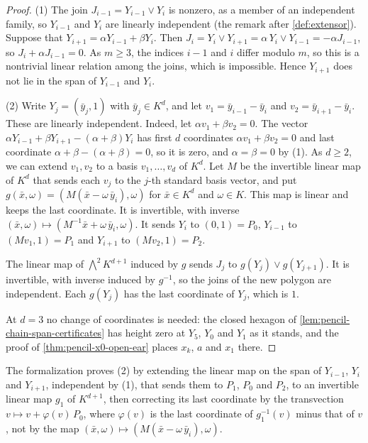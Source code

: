 \begin{proof}
  \leanok
  (1) The join $J_{i-1} = Y_{i-1} \vee Y_i$ is nonzero, as a member of
  an independent family, so $Y_{i-1}$ and $Y_i$ are linearly independent
  (the remark after \cref{def:extensor}). Suppose that
  $Y_{i+1} = \alpha Y_{i-1} + \beta Y_i$. Then
  $J_i = Y_i \vee Y_{i+1} = \alpha\, Y_i \vee Y_{i-1} = -\alpha J_{i-1}$,
  so $J_i + \alpha J_{i-1} = 0$. As $m \ge 3$, the indices $i - 1$ and $i$
  differ modulo $m$, so this is a nontrivial linear relation among the
  joins, which is impossible. Hence $Y_{i+1}$ does not lie in the span of
  $Y_{i-1}$ and $Y_i$.

  (2) Write $Y_j = (\bar y_j, 1)$ with $\bar y_j \in K^d$, and let
  $v_1 = \bar y_{i-1} - \bar y_i$ and $v_2 = \bar y_{i+1} - \bar y_i$.
  These are linearly independent. Indeed, let
  $\alpha v_1 + \beta v_2 = 0$. The vector
  $\alpha Y_{i-1} + \beta Y_{i+1} - (\alpha + \beta) Y_i$ has first $d$
  coordinates $\alpha v_1 + \beta v_2 = 0$ and last coordinate
  $\alpha + \beta - (\alpha + \beta) = 0$, so it is zero, and
  $\alpha = \beta = 0$ by (1). As $d \ge 2$, we can extend $v_1, v_2$ to
  a basis $v_1, \dots, v_d$ of $K^d$. Let $M$ be the invertible linear
  map of $K^d$ that sends each $v_j$ to the $j$-th standard basis
  vector, and put
  $g(\bar x, \omega) = (M(\bar x - \omega\, \bar y_i), \omega)$ for
  $\bar x \in K^d$ and $\omega \in K$. This map is linear and keeps the
  last coordinate. It is invertible, with inverse
  $(\bar x, \omega) \mapsto (M^{-1} \bar x + \omega\, \bar y_i, \omega)$.
  It sends $Y_i$ to $(0, 1) = P_0$, $Y_{i-1}$ to $(M v_1, 1) = P_1$ and
  $Y_{i+1}$ to $(M v_2, 1) = P_2$.

  The linear map of $\bigwedge^2 K^{d+1}$ induced by $g$ sends $J_j$ to
  $g(Y_j) \vee g(Y_{j+1})$. It is invertible, with inverse induced by
  $g^{-1}$, so the joins of the new polygon are independent. Each
  $g(Y_j)$ has the last coordinate of $Y_j$, which is $1$.

  At $d = 3$ no change of coordinates is needed: the closed hexagon of
  \cref{lem:pencil-chain-span-certificates} has height zero at $Y_5$,
  $Y_0$ and $Y_1$ as it stands, and the proof of
  \cref{thm:pencil-x0-open-ear} places $x_k$, $a$ and $x_1$ there.
\end{proof}

\begin{fmlnote}
  The formalization proves (2) by extending the linear map on the span
  of $Y_{i-1}$, $Y_i$ and $Y_{i+1}$, independent by (1), that sends them
  to $P_1$, $P_0$ and $P_2$, to an invertible linear map $g_1$ of
  $K^{d+1}$, then correcting its last coordinate by the transvection
  $v \mapsto v + \varphi(v)\, P_0$, where $\varphi(v)$ is the last
  coordinate of $g_1^{-1}(v)$ minus that of $v$, not by the map
  $(\bar x, \omega) \mapsto (M(\bar x - \omega\, \bar y_i), \omega)$.
\end{fmlnote}

